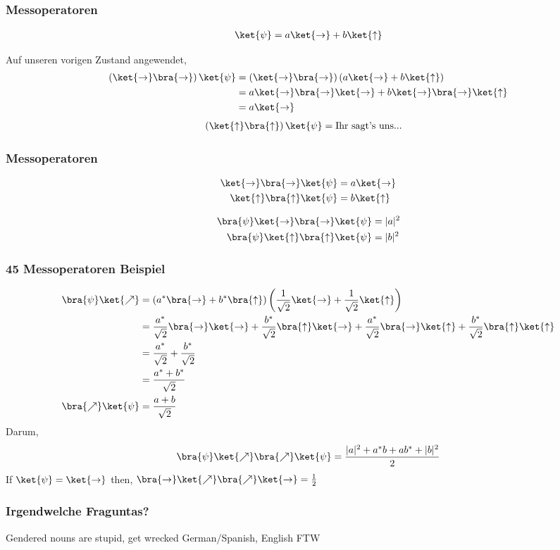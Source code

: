 \documentclass{beamer}
\begin{document}
\begin{frame}
\frametitle{Messoperatoren}
\begin{align*}
\ket{\psi} = a\ket{\rightarrow} + b\ket{\uparrow}
\end{align*}

\bigskip
Auf unseren vorigen Zustand angewendet,
\begin{align*}
    \left(\ket{\rightarrow}\bra{\rightarrow}\right) \ket{\psi}
    &=
    \left(\ket{\rightarrow}\bra{\rightarrow}\right)
    \left(a\ket{\to} + b\ket{\uparrow}\right) \\
    &= a\ket{\rightarrow}\bra{\rightarrow}\ket{\rightarrow} + b\ket{\rightarrow}\bra{\rightarrow}\ket{\uparrow} \\
    &= a\ket{\rightarrow}
\end{align*}
\begin{align*}
    \left(\ket{\uparrow}\bra{\uparrow}\right) \ket{\psi} &= \text{Ihr sagt's uns...}
\end{align*}
\end{frame}

\begin{frame}
\frametitle{Messoperatoren}
\begin{align*}
    \ket{\rightarrow}\bra{\rightarrow} \ket{\psi}
    &= a\ket{\rightarrow} \\
    \ket{\uparrow}\bra{\uparrow} \ket{\psi} &= b\ket{\uparrow}
\end{align*}

\begin{align*}
    \bra{\psi}\ket{\rightarrow}\bra{\rightarrow} \ket{\psi}
    &= |a|^2 \\
    \bra{\psi}\ket{\uparrow}\bra{\uparrow} \ket{\psi} &= |b|^2
\end{align*}
\end{frame}

\begin{frame}
\frametitle{45 Messoperatoren Beispiel}
\begin{align*}
\bra{\psi}\ket{\nearrow} &= \left(a^*\bra{\rightarrow} + b^*\bra{\uparrow}\right)\left(\frac{1}{\sqrt{2}}\ket{\rightarrow} + \frac{1}{\sqrt{2}}\ket{\uparrow}\right) \\
&= \frac{a^*}{\sqrt{2}}\bra{\rightarrow}\ket{\rightarrow} + \frac{b^*}{\sqrt{2}}\bra{\uparrow}\ket{\rightarrow} + \frac{a^*}{\sqrt{2}}\bra{\rightarrow}\ket{\uparrow} + \frac{b^*}{\sqrt{2}}\bra{\uparrow}\ket{\uparrow} \\
&= \frac{a^*}{\sqrt{2}} + \frac{b^*}{\sqrt{2}} \\
&= \frac{a^* + b^*}{\sqrt{2}} \\
\bra{\nearrow}\ket{\psi} &= \frac{a + b}{\sqrt{2}}
\end{align*}
Darum,
\begin{align*}
\bra{\psi}\ket{\nearrow}\bra{\nearrow}\ket{\psi} = \frac{|a|^2 + a^*b + ab^* + |b|^2}{2}
\end{align*}
If $\ket{\psi} = \ket{\rightarrow}$ then, $\bra{\rightarrow}\ket{\nearrow}\bra{\nearrow}\ket{\rightarrow} = \frac{1}{2}$
\end{frame}










\begin{frame}
\frametitle{\textquestiondown Irgendwelche Fraguntas?}
Gendered nouns are stupid, get wrecked German/Spanish, English FTW
\end{frame}
\end{document}
